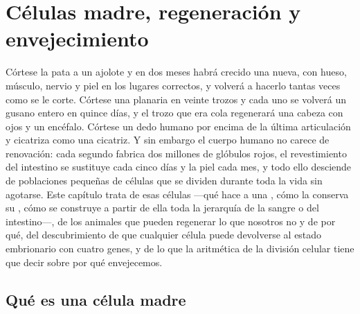 \chapter{Células madre, regeneración y envejecimiento}\label{ch:b3:stem-cells}

Córtese la pata a un ajolote y en dos meses habrá crecido una nueva,
con hueso, músculo, nervio y piel en los lugares correctos, y volverá a
hacerlo tantas veces como se le corte. Córtese una planaria en veinte
trozos y cada uno se volverá un gusano entero en quince días, y el
trozo que era cola regenerará una cabeza con ojos y un encéfalo.
Córtese un dedo humano por encima de la última articulación y cicatriza
como una cicatriz. Y sin embargo el cuerpo humano no carece de
renovación: cada segundo fabrica dos millones de glóbulos rojos, el
revestimiento del intestino se sustituye cada cinco días y la piel cada
mes, y todo ello desciende de poblaciones pequeñas de células que se
dividen durante toda la vida sin agotarse. Este capítulo trata de esas
células ---qué hace a una , cómo la conserva su , cómo
se construye a partir de ella toda la jerarquía de la sangre o del
intestino---, de los animales que pueden regenerar lo que nosotros no y
de por qué, del descubrimiento de que cualquier célula puede
devolverse al estado embrionario con cuatro genes, y de lo que la
aritmética de la división celular tiene que decir sobre por qué
envejecemos.

\section{Qué es una célula madre}

